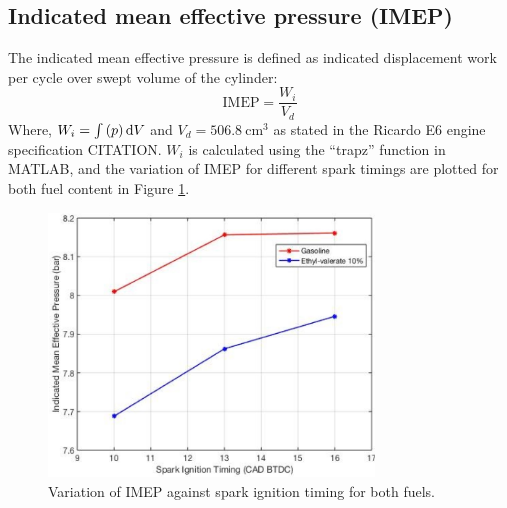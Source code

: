 \documentclass[11pt]{article}
\begin{document}
\subsection*{Indicated mean effective pressure (IMEP)}
The indicated mean effective pressure is defined as indicated displacement work per cycle over swept volume of the cylinder: 
\begin{equation}
    \textrm{IMEP} = \frac{W_i}{V_d}
\end{equation}
Where, 
$W_i = \int \left(p\right)\dif V$ and $V_d = \SI{506.8}{\centi\meter\cubed}$ as stated in the Ricardo E6 engine specification CITATION. $W_i$ is calculated using the “trapz” function in MATLAB, and the variation of IMEP for different spark timings are plotted for both fuel content in Figure \ref{q1-f5}. 
\begin{figure}[H]
    \centering
    \includegraphics[height = 7cm]{./img/diagram12.png}
    \caption{Variation of IMEP against spark ignition timing for both fuels.}
    \label{q1-f5}
\end{figure}
\end{document}
